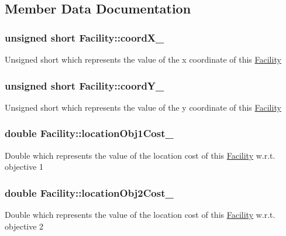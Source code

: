 \subsection{\-Member \-Data \-Documentation}
\hypertarget{classFacility_a46e539865a0161f0a2c5e7644ea5d75d}{
\subsubsection[{coord\-X\-\_\-}]{\setlength{\rightskip}{0pt plus 5cm}unsigned short {\bf \-Facility\-::coord\-X\-\_\-}}}\label{classFacility_a46e539865a0161f0a2c5e7644ea5d75d}
\-Unsigned short which represents the value of the x coordinate of this {\ttfamily \hyperlink{classFacility}{\-Facility}} \hypertarget{classFacility_a2a72bbcf1fe5dc2faee8a02a918fc29f}{
\subsubsection[{coord\-Y\-\_\-}]{\setlength{\rightskip}{0pt plus 5cm}unsigned short {\bf \-Facility\-::coord\-Y\-\_\-}}}\label{classFacility_a2a72bbcf1fe5dc2faee8a02a918fc29f}
\-Unsigned short which represents the value of the y coordinate of this {\ttfamily \hyperlink{classFacility}{\-Facility}} \hypertarget{classFacility_a0239174cc91d2bab7829a4e460cad3be}{
\subsubsection[{location\-Obj1\-Cost\-\_\-}]{\setlength{\rightskip}{0pt plus 5cm}double {\bf \-Facility\-::location\-Obj1\-Cost\-\_\-}}}\label{classFacility_a0239174cc91d2bab7829a4e460cad3be}
\-Double which represents the value of the location cost of this {\ttfamily \hyperlink{classFacility}{\-Facility}} w.\-r.\-t. objective 1 \hypertarget{classFacility_a09096b7ea289d3e4a6782c188b1a0e4d}{
\subsubsection[{location\-Obj2\-Cost\-\_\-}]{\setlength{\rightskip}{0pt plus 5cm}double {\bf \-Facility\-::location\-Obj2\-Cost\-\_\-}}}\label{classFacility_a09096b7ea289d3e4a6782c188b1a0e4d}
\-Double which represents the value of the location cost of this {\ttfamily \hyperlink{classFacility}{\-Facility}} w.\-r.\-t. objective 2 

